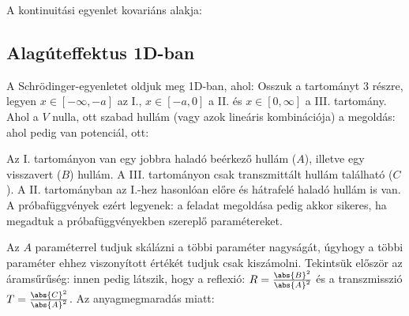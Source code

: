     A kontinuitási egyenlet kovariáns alakja: 
    
  \subsection{Alagúteffektus 1D-ban}
   
   A Schrödinger-egyenletet oldjuk meg 1D-ban, ahol: 
   Osszuk a tartományt 3 részre, legyen $x\in[-\infty,-a]$ az I., $x\in[-a,0]$ a II. és $x\in[0,\infty]$ a III. tartomány.
   Ahol a $V$ nulla, ott szabad hullám (vagy azok lineáris kombinációja) a megoldás:
   ahol pedig van potenciál, ott:
   
   Az I. tartományon van egy jobbra haladó beérkező hullám ($A$), illetve egy visszavert ($B$) hullám.
   A III. tartományon csak transzmittált hullám található ($C$).
   A II. tartományban az I.-hez hasonlóan előre és hátrafelé haladó hullám is van.
   A próbafüggvények ezért legyenek:
   a feladat megoldása pedig akkor sikeres, ha megadtuk a próbafüggvényekben szereplő paramétereket. 
   
   Az $A$ paraméterrel tudjuk skálázni a többi paraméter nagyságát, úgyhogy a többi paraméter ehhez viszonyított értékét tudjuk csak kiszámolni.
   Tekintsük először az áramsűrűség:
   innen pedig látszik, hogy a reflexió: $R=\frac{\abs{B}^2}{\abs{A}^2}$ és a transzmisszió $T=\frac{\abs{C}^2}{\abs{A}^2}$.
   Az anyagmegmaradás miatt:
   
